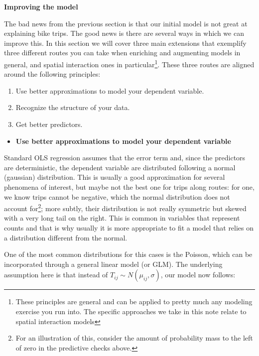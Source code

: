 \documentclass[
]{book}
\providecommand{\tightlist}{%
  \setlength{\itemsep}{0pt}\setlength{\parskip}{0pt}}
\begin{document}
\textbf{Improving the model}

The bad news from the previous section is that our initial model is not great at explaining bike trips. The good news is there are several ways in which we can improve this. In this section we will cover three main extensions that exemplify three different routes you can take when enriching and augmenting models in general, and spatial interaction ones in particular\footnote{These principles are general and can be applied to pretty much any modeling exercise you run into. The specific approaches we take in this note relate to spatial interaction models}. These three routes are aligned around the following principles:

\begin{enumerate}
\def\labelenumi{\arabic{enumi}.}
\tightlist
\item
  Use better approximations to model your dependent variable.
\item
  Recognize the structure of your data.
\item
  Get better predictors.
\end{enumerate}

\begin{itemize}
\tightlist
\item
  \textbf{Use better approximations to model your dependent variable}
\end{itemize}

Standard OLS regression assumes that the error term and, since the predictors are deterministic, the dependent variable are distributed following a normal (gaussian) distribution. This is usually a good approximation for several phenomena of interest, but maybe not the best one for trips along routes: for one, we know trips cannot be negative, which the normal distribution does not account for\footnote{For an illustration of this, consider the amount of probability mass to the left of zero in the predictive checks above.}; more subtly, their distribution is not really symmetric but skewed with a very long tail on the right. This is common in variables that represent counts and that is why usually it is more appropriate to fit a model that relies on a distribution different from the normal.

One of the most common distributions for this cases is the Poisson, which can be incorporated through a general linear model (or GLM). The underlying assumption here is that instead of \(T_{ij} \sim N(\mu_{ij}, \sigma)\), our model now follows:
\end{document}

